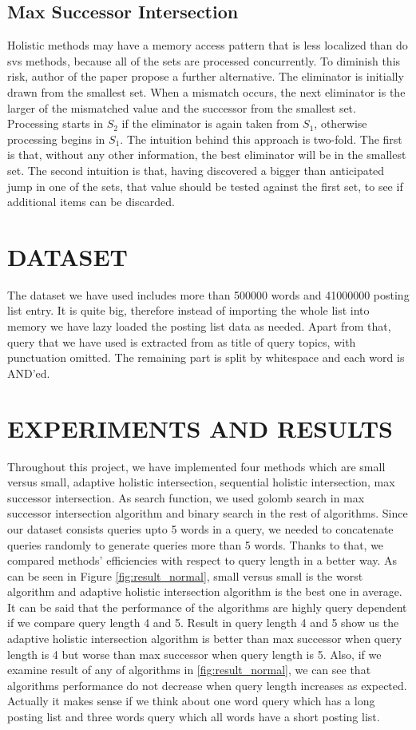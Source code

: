 \documentclass[paper=a4, fontsize=11pt]{scrartcl} %
\numberwithin{equation}{section} %
\numberwithin{figure}{section} %
\numberwithin{table}{section} %
\begin{document}
\subsection{Max Successor Intersection}

Holistic methods may have a memory access pattern that is less localized than do svs methods, because all of the sets are processed concurrently. To diminish this risk, author of the paper propose a further alternative. The eliminator is initially drawn from the smallest set. When a mismatch occurs, the next eliminator is the larger of the mismatched value and the successor from the smallest set. Processing starts in $S_{2}$ if the eliminator is again taken from $S_{1}$, otherwise processing begins in $S_{1}$. The intuition behind this approach is two-fold. The first is that, without any other information, the best eliminator will be in the smallest set. The second intuition is that, having discovered a bigger than anticipated jump in one of the sets, that value should be tested against the first set, to see if additional items can be discarded.

\newpage
\section{DATASET}
The dataset we have used includes more than 500000 words and 41000000 posting list entry. It is quite big, therefore instead of importing the whole list into memory we have lazy loaded the posting list data as needed. Apart from that, query that we have used is extracted from as title of query topics, with punctuation omitted. The remaining part is split by whitespace and each word is AND'ed.


\newpage
\section{EXPERIMENTS AND RESULTS}
Throughout this project, we have implemented four methods which are small versus small, adaptive holistic intersection, sequential holistic intersection, max successor intersection. As search function, we used golomb search in max successor intersection algorithm and binary search in the rest of algorithms. Since our dataset consists queries upto 5 words in a query,  we needed to concatenate queries randomly to generate queries more than 5 words. Thanks to that, we compared methods' efficiencies with respect to query length in a better way. As can be seen in Figure \ref{fig:result_normal}, small versus small is the worst algorithm and adaptive holistic intersection algorithm is the best one in average. It can be said that the performance of the algorithms are highly query dependent if we compare query length 4 and 5. Result in query length 4 and 5 show us the adaptive holistic intersection algorithm is better than max successor when query length is 4 but worse than max successor when query length is 5. Also, if we examine result of any of algorithms in \ref{fig:result_normal}, we can see that algorithms performance do not decrease when query length increases as expected. Actually it makes sense if we think about one word query which has a long posting list and three words query which all words have a short posting list.
 
\end{document}

